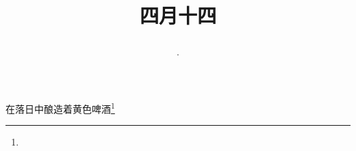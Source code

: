\title{\date[d=21,m=5,y=2024][year:cn-y,年,month:cn,day:cn,日,·,weekday]·四月十四 }
在落日中酿造着黄色啤酒\footnote{ }

